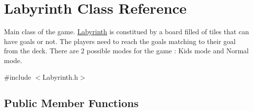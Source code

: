 \hypertarget{classLabyrinth}{}\section{Labyrinth Class Reference}
\label{classLabyrinth}


Main class of the game. \mbox{\hyperlink{classLabyrinth}{Labyrinth}} is constitued by a board filled of tiles that can have goals or not. The players need to reach the goals matching to their goal from the deck. There are 2 possible modes for the game \+: Kids mode and Normal mode.  




{\ttfamily \#include $<$Labyrinth.\+h$>$}

\subsection*{Public Member Functions}
